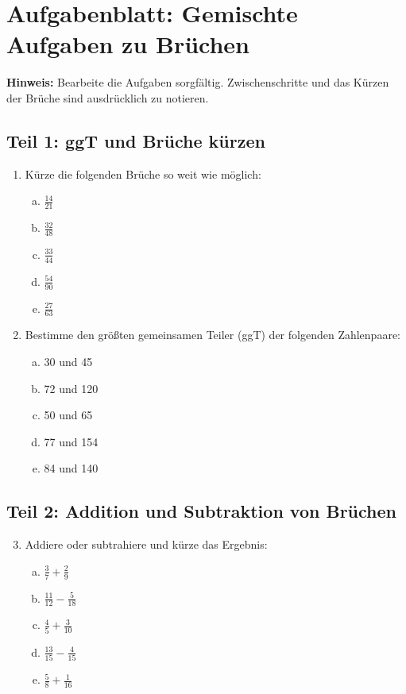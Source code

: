 \section*{Aufgabenblatt: Gemischte Aufgaben zu Brüchen}

\textbf{Hinweis:} Bearbeite die Aufgaben sorgfältig. Zwischenschritte und das Kürzen der Brüche sind ausdrücklich zu notieren.

\subsection*{Teil 1: ggT und Brüche kürzen}
\begin{enumerate}
    \item Kürze die folgenden Brüche so weit wie möglich:
    \begin{enumerate}[a)]
        \item $\frac{14}{21}$
        \item $\frac{32}{48}$
        \item $\frac{33}{44}$
        \item $\frac{54}{90}$
        \item $\frac{27}{63}$
    \end{enumerate}
    \item Bestimme den größten gemeinsamen Teiler (ggT) der folgenden Zahlenpaare:
    \begin{enumerate}[a)]
        \item 30 und 45
        \item 72 und 120
        \item 50 und 65
        \item 77 und 154
        \item 84 und 140
    \end{enumerate}
\end{enumerate}

\subsection*{Teil 2: Addition und Subtraktion von Brüchen}
\begin{enumerate}
    \setcounter{enumi}{2}
    \item Addiere oder subtrahiere und kürze das Ergebnis:
    \begin{enumerate}[a)]
        \item $\frac{3}{7} + \frac{2}{9}$
        \item $\frac{11}{12} - \frac{5}{18}$
        \item $\frac{4}{5} + \frac{3}{10}$
        \item $\frac{13}{15} - \frac{4}{15}$
        \item $\frac{5}{8} + \frac{1}{16}$
    \end{enumerate}
\end{enumerate}

